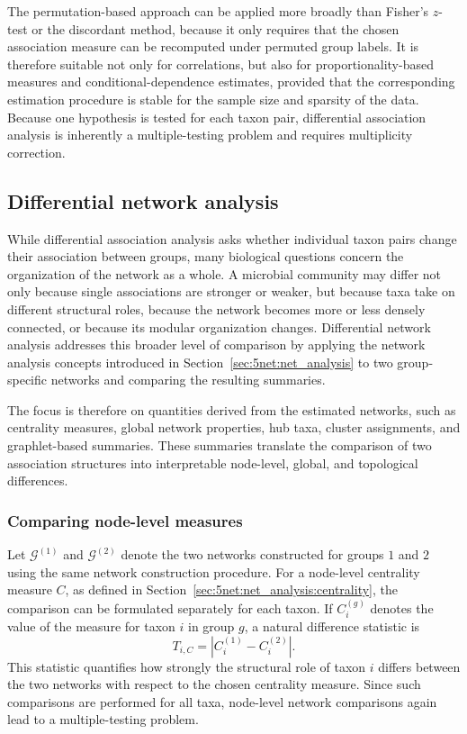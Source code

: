 The permutation-based approach can be applied more broadly than Fisher's $z$-test or the discordant method, because it only requires that the chosen association measure can be recomputed under permuted group labels. It is therefore suitable not only for correlations, but also for proportionality-based measures and conditional-dependence estimates, provided that the corresponding estimation procedure is stable for the sample size and sparsity of the data. Because one hypothesis is tested for each taxon pair, differential association analysis is inherently a multiple-testing problem and requires multiplicity correction.

\subsection{Differential network analysis}
\label{sec:5net:net_comparison:differential_network}

While differential association analysis asks whether individual taxon pairs change their association between groups, many biological questions concern the organization of the network as a whole. A microbial community may differ not only because single associations are stronger or weaker, but because taxa take on different structural roles, because the network becomes more or less densely connected, or because its modular organization changes. Differential network analysis addresses this broader level of comparison by applying the network analysis concepts introduced in Section~\ref{sec:5net:net_analysis} to two group-specific networks and comparing the resulting summaries.

The focus is therefore on quantities derived from the estimated networks, such as centrality measures, global network properties, hub taxa, cluster assignments, and graphlet-based summaries. These summaries translate the comparison of two association structures into interpretable node-level, global, and topological differences.

\subsubsection*{Comparing node-level measures}

Let $\mathcal{G}^{(1)}$ and $\mathcal{G}^{(2)}$ denote the two networks constructed for groups $1$ and $2$ using the same network construction procedure. For a node-level centrality measure $C$, as defined in Section~\ref{sec:5net:net_analysis:centrality}, the comparison can be formulated separately for each taxon. If $C_i^{(g)}$ denotes the value of the measure for taxon $i$ in group $g$, a natural difference statistic is
\begin{equation}
\label{eq:5net:net_comparison:centrality_difference_statistic}
T_{i,C} = \left|C_i^{(1)} - C_i^{(2)}\right|.
\end{equation}
This statistic quantifies how strongly the structural role of taxon $i$ differs between the two networks with respect to the chosen centrality measure. Since such comparisons are performed for all taxa, node-level network comparisons again lead to a multiple-testing problem.

